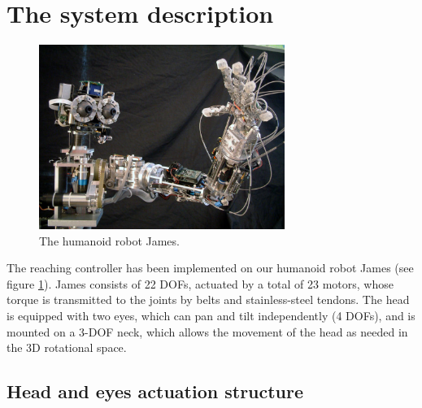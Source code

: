 \section{The system description}

\begin{figure}[h!tbp]
\centering
\includegraphics[width=80mm]{Figure/James1.jpg}
\caption{The humanoid robot James.}
\label{Fig:PicureJames}
\end{figure}

The reaching controller has been implemented on our humanoid robot James (see figure \ref{Fig:PicureJames}). James consists of 22 DOFs, actuated by a total of 23 motors, whose torque is transmitted to the joints by belts and stainless-steel tendons. The head is equipped with two eyes, which can pan and tilt independently (4 DOFs), and is mounted on a 3-DOF neck, which allows the movement of the head as needed in the 3D rotational space.


\subsection{Head and eyes actuation structure} \label{Sec:HeadEyesStructure}

